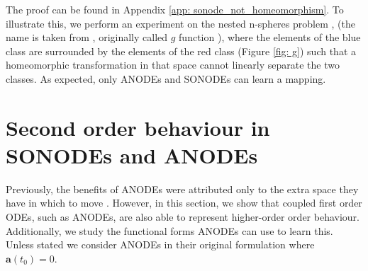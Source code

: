 \documentclass{article}
\theoremstyle{remark}
\theoremstyle{definition}
\begin{document}
The proof can be found in Appendix \ref{app: sonode_not_homeomorphism}. To illustrate this, we perform an experiment on the nested n-spheres problem \citep{dupont2019augmented}, (the name is taken from \cite{massaroli2020dissecting}, originally called $g$ function \cite{dupont2019augmented}), where the elements of the blue class are surrounded by the elements of the red class (Figure \ref{fig: g}) such that a homeomorphic transformation in that space cannot linearly separate the two classes. As expected, only ANODEs and SONODEs can learn a mapping.

\section{Second order behaviour in SONODEs and ANODEs}
\label{sec: anodes_learn_2nd_order}

Previously, the benefits of ANODEs were attributed only to the extra space they have in which to move \citep{dupont2019augmented}. However, in this section, we show that coupled first order ODEs, such as ANODEs, are also able to represent higher-order order behaviour. Additionally, we study the functional forms ANODEs can use to learn this. Unless stated we consider ANODEs in their original formulation where $\mathbf{a}(t_{0})=0$.
\end{document}
